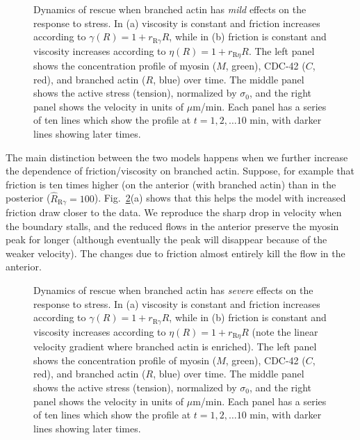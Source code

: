 \documentclass[11pt]{article}
\newcommand{\6}[1]{#1_{\text{6}}}
\newcommand{\3}[1]{#1_{\text{3}}}
\begin{document}
\begin{figure}
\centering
{}
\caption{\label{fig:BAFric} Dynamics of rescue when branched actin has \emph{mild} effects on the response to stress. In (a) viscosity is constant and friction increases according to $\gamma(R)=1+r_\text{R$\gamma$}R$, while in (b) friction is constant and viscosity increases according to $ \eta(R)=1+r_\text{R$\eta$} R$. The left panel shows the concentration profile of myosin ($M$, green), CDC-42 ($C$, red), and branched actin ($R$, blue) over time. The middle panel shows the active stress (tension), normalized by $\sigma_0$, and the right panel shows the velocity in units of $\mu$m/min. Each panel has a series of ten lines which show the profile at $t=1, 2, \dots 10$ min, with darker lines showing later times.}
\end{figure}

The main distinction between the two models happens when we further increase the dependence of friction/viscosity on branched actin. Suppose, for example that friction is ten times higher (on the anterior (with branched actin) than in the posterior ($\hat R_\text{R$\gamma$}=100$). Fig.\ \ref{fig:BAFricLg}(a) shows that this helps the model with increased friction draw closer to the data. We reproduce the sharp drop in velocity when the boundary stalls, and the reduced flows in the anterior preserve the myosin peak for longer (although eventually the peak will disappear because of the weaker velocity). The changes due to friction almost entirely kill the flow in the anterior. 

\begin{figure}
\centering
{}
\caption{\label{fig:BAFricLg} Dynamics of rescue when branched actin has \emph{severe} effects on the response to stress. In (a) viscosity is constant and friction increases according to $\gamma(R)=1+r_\text{R$\gamma$}R$, while in (b) friction is constant and viscosity increases according to $ \eta(R)=1+r_\text{R$\eta$} R$ (note the linear velocity gradient where branched actin is enriched). The left panel shows the concentration profile of myosin ($M$, green), CDC-42 ($C$, red), and branched actin ($R$, blue) over time. The middle panel shows the active stress (tension), normalized by $\sigma_0$, and the right panel shows the velocity in units of $\mu$m/min. Each panel has a series of ten lines which show the profile at $t=1, 2, \dots 10$ min, with darker lines showing later times.}
\end{figure}
\end{document}
